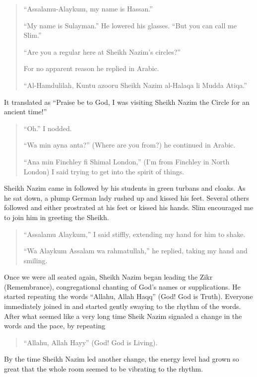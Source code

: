 \documentclass[12pt]{memoir}
\newcommand{\cor}[2]{#2} %
\def\–{-\hskip0pt}
\begin{document}
\begin{quote}
“Assalamu-\cor{Aalykum}{Alaykum}, my name is Hassan.”

“My name is Sulayman.” He lowered his glasses.
“But you can call me Slim.”

“Are you a regular here at Sheikh Nazim’s circles?”

For no apparent reason he replied in Arabic.

“Al-Hamdulilah, Kuntu azooru Sheikh Nazim al\–Halaqa li Mudda Atiqa.”
\end{quote}

It translated as “Praise be to God,
I was visiting Sheikh Nazim the Circle for an ancient time!”

\begin{quote}
“Oh.” I nodded.

“Wa min ayna anta?” (Where are you from?) he continued in Arabic.

“Ana min Finchley fi Shimal London,”
(I’m from Finchley in North London)
I said trying to get into the spirit of things.
\end{quote}

Sheikh Nazim came in followed by his students in green turbans and cloaks.
As he sat down, a plump German lady rushed up and kissed his feet.
Several others followed and either prostrated at his feet or kissed his hands.
Slim encouraged me to join him in greeting the Sheikh.

\begin{quote}
“Assalamu Alaykum,” I said stiffly, extending my hand for him to shake.

“Wa Alaykum Assalam wa rahmatullah,” he replied, taking my hand and smiling.
\end{quote}

Once we were all seated again,
Sheikh Nazim began leading the Zikr (Remembrance),
congregational chanting of God’s names or supplications.
He started repeating the words “Allahu, Allah Haqq” (God! God is Truth).
Everyone immediately joined in
and started gently swaying to the rhythm of the words.
After what seemed like a very long time Sheik Nazim signaled a change
in the words and the pace, by repeating

\begin{quote}
“Allahu, Allah Hayy” (God! God is Living).
\end{quote}

By the time Sheikh Nazim led another change,
the energy level had grown so great
that the whole room seemed to be vibrating to the rhythm.
\end{document}
